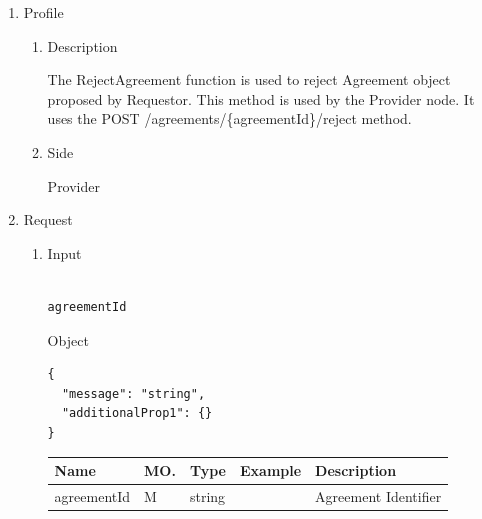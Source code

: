 \newpage



\begin{enumerate}

\item Profile

\begin{enumerate}

\item Description

The RejectAgreement function is used to reject Agreement object proposed by Requestor. This method is used by the Provider node. 
It uses the POST /agreements/\{agreementId\}/reject method.

\item Side

Provider

\end{enumerate}

\item Request

\begin{enumerate}

\item Input

\begin{tcolorbox}[boxrule=0pt, frame empty]
\begin{verbatim}

agreementId

\end{verbatim}
\end{tcolorbox}

Object
\begin{tcolorbox}[boxrule=0pt, frame empty]
\begin{verbatim}
{
  "message": "string",
  "additionalProp1": {}
}
\end{verbatim}
\end{tcolorbox}

\begin{table}[H]
\footnotesize

\begin{center}
\begin{tabular}{|p{3cm}|l|p{3cm}|p{3cm}|p{4cm}|} 
\hline
\rowcolor{lightgray}	Name	& MO.	& Type	& Example & 	Description \\
\hline

agreementId		& M & 	string				&		& 	Agreement Identifier \\
\hline


\end{tabular}
\end{center}
\end{table}
\end{enumerate}
\end{enumerate}
